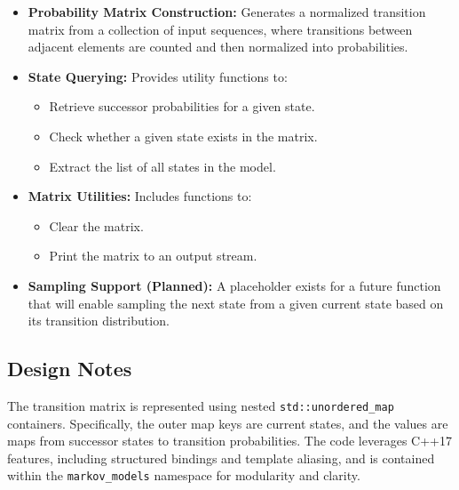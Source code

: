 \begin{itemize}\itemsep0em
    \item \textbf{Probability Matrix Construction:} 
    Generates a normalized transition matrix from a collection of input sequences, where transitions between adjacent elements are counted and then normalized into probabilities.

    \item \textbf{State Querying:}
    Provides utility functions to:
    \begin{itemize}\itemsep0em
        \item Retrieve successor probabilities for a given state.
        \item Check whether a given state exists in the matrix.
        \item Extract the list of all states in the model.
    \end{itemize}

    \item \textbf{Matrix Utilities:}
    Includes functions to:
    \begin{itemize}\itemsep0em
        \item Clear the matrix.
        \item Print the matrix to an output stream.
    \end{itemize}

    \item \textbf{Sampling Support (Planned):}
    A placeholder exists for a future function that will enable sampling the next state from a given current state based on its transition distribution.
\end{itemize}

\subsection{Design Notes}

The transition matrix is represented using nested \texttt{std::unordered\_map} containers. Specifically, the outer map keys are current states, and the values are maps from successor states to transition probabilities. The code leverages C++17 features, including structured bindings and template aliasing, and is contained within the \texttt{markov\_models} namespace for modularity and clarity.




















